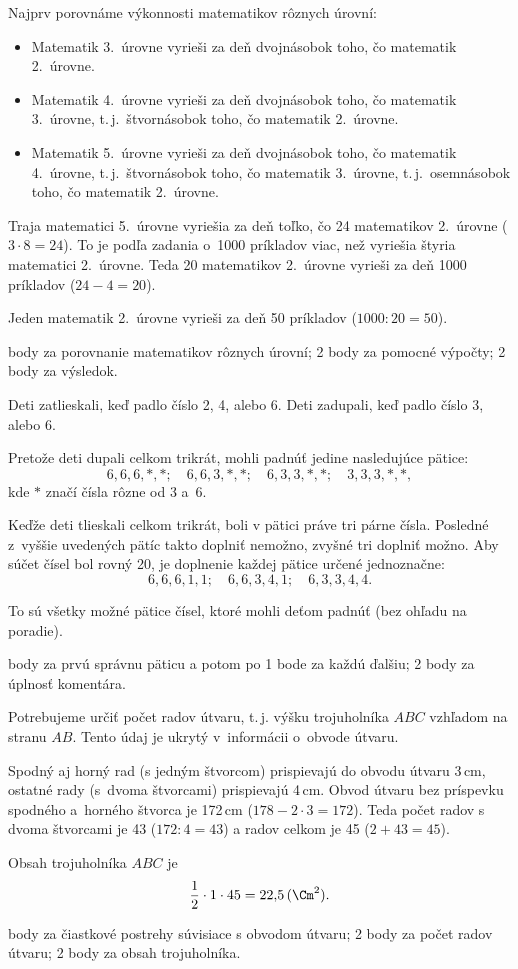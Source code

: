 {%
Najprv porovnáme výkonnosti matematikov rôznych úrovní:
\begin{itemize}
\item Matematik 3.~úrovne vyrieši za deň dvojnásobok toho, čo matematik 2.~úrovne.
\item Matematik 4.~úrovne vyrieši za deň dvojnásobok toho, čo matematik 3.~úrovne, t.\,j.~štvornásobok toho, čo matematik 2.~úrovne.
\item Matematik 5.~úrovne vyrieši za deň dvojnásobok toho, čo matematik 4.~úrovne, t.\,j.~štvornásobok toho, čo matematik 3.~úrovne, t.\,j.~osemnásobok toho, čo matematik 2.~úrovne.
\end{itemize}

Traja matematici 5.~úrovne vyriešia za deň toľko, čo 24 matematikov 2.~úrovne ($3\cdot8=24$).
To je podľa zadania o~1000 príkladov viac, než vyriešia štyria matematici 2.~úrovne.
Teda 20 matematikov 2.~úrovne vyrieši za deň 1000 príkladov ($24-4=20$).

Jeden matematik 2.~úrovne vyrieši za deň 50 príkladov ($1000:20=50$).

 body za porovnanie matematikov rôznych úrovní; 2 body za pomocné výpočty; 2 body za výsledok.
\endhodnotenie
}

{%
Deti zatlieskali, keď padlo číslo 2, 4, alebo 6.
Deti zadupali, keď padlo číslo 3, alebo 6.

Pretože deti dupali celkom trikrát, mohli padnúť jedine nasledujúce pätice:
$$
6,6,6,*,*; \quad 6,6,3,*,*; \quad 6,3,3,*,*; \quad 3,3,3,*,*,
$$
kde $*$ značí čísla rôzne od 3 a~6.

Keďže deti tlieskali celkom trikrát, boli v pätici práve tri párne čísla.
Posledné z~vyššie uvedených pätíc takto doplniť nemožno, zvyšné tri doplniť možno.
Aby súčet čísel bol rovný 20, je doplnenie každej pätice určené jednoznačne:
$$
6,6,6,1,1; \quad 6,6,3,4,1; \quad 6,3,3,4,4.
$$

To sú všetky možné pätice čísel, ktoré mohli deťom padnúť (bez ohľadu na poradie).

 body za prvú správnu päticu a potom po 1 bode za každú ďalšiu; 2 body za úplnosť komentára.
\endhodnotenie
}

{%
Potrebujeme určiť počet radov útvaru, t.\,j. výšku trojuholníka $ABC$ vzhľadom na stranu $AB$.
Tento údaj je ukrytý v~informácii o~obvode útvaru.

Spodný aj horný rad (s jedným štvorcom) prispievajú do obvodu útvaru 3\,cm, ostatné rady (s~dvoma štvorcami) prispievajú 4\,cm.
Obvod útvaru bez príspevku spodného a~horného štvorca je 172\,cm ($178-2\cdot3=172$).
Teda počet radov s dvoma štvorcami je 43 ($172:4=43$) a radov celkom je 45 ($2+43=45$).

Obsah trojuholníka $ABC$ je
$$
\frac12\cdot1\cdot45 =22{,}5\,(\Cm^2).
$$

 body za čiastkové postrehy súvisiace s obvodom útvaru; 2 body za
počet radov útvaru; 2 body za obsah trojuholníka.
\endhodnotenie
}


